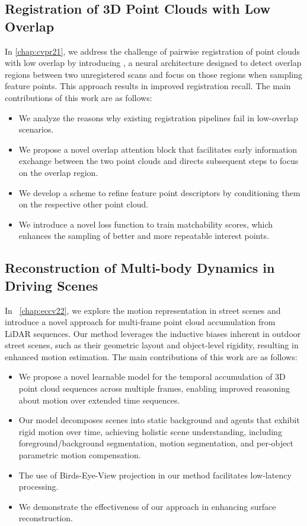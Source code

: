 \subsection{Registration of 3D Point Clouds with Low Overlap}
In \cref{chap:cvpr21}, we address the challenge of pairwise registration of point clouds with low overlap by introducing \acro, a neural architecture designed to detect overlap regions between two unregistered scans and focus on those regions when sampling feature points. This approach results in improved registration recall. The main contributions of this work are as follows:

\begin{itemize}
\item We analyze the reasons why existing registration pipelines fail in low-overlap scenarios.
\item We propose a novel overlap attention block that facilitates early information exchange between the two point clouds and directs subsequent steps to focus on the overlap region.
\item We develop a scheme to refine feature point descriptors by conditioning them on the respective other point cloud.
\item We introduce a novel loss function to train matchability scores, which enhances the sampling of better and more repeatable interest points.
\end{itemize}

\subsection{Reconstruction of Multi-body Dynamics in Driving Scenes}
In ~\cref{chap:eccv22}, we explore the motion representation in street scenes and introduce a novel approach for multi-frame point cloud accumulation from LiDAR sequences. Our method leverages the inductive biases inherent in outdoor street scenes, such as their geometric layout and object-level rigidity, resulting in enhanced motion estimation. The main contributions of this work are as follows:

\begin{itemize}
\item We propose a novel learnable model for the temporal accumulation of 3D point cloud sequences across multiple frames, enabling improved reasoning about motion over extended time sequences.
\item Our model decomposes scenes into static background and agents that exhibit rigid motion over time, achieving holistic scene understanding, including foreground/background segmentation, motion segmentation, and per-object parametric motion compensation.
\item The use of Birds-Eye-View projection in our method facilitates low-latency processing.
\item We demonstrate the effectiveness of our approach in enhancing surface reconstruction.
\end{itemize}

